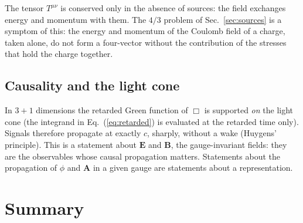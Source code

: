 \documentclass[11pt,a4paper]{book}
\begin{document}
The tensor $T^{\mu\nu}$ is conserved only in the absence of sources: the field exchanges energy and momentum
with them. The $4/3$ problem of Sec.~\ref{sec:sources} is a symptom of this: the energy and momentum of the
Coulomb field of a charge, taken alone, do not form a four-vector without the contribution of the
stresses that hold the charge together.

\subsection{Causality and the light cone}

In $3+1$ dimensions the retarded Green function of $\Box$ is supported \emph{on} the light cone (the
integrand in Eq.~(\ref{eq:retarded}) is evaluated at the retarded time only). Signals therefore propagate at exactly
$c$, sharply, without a wake (Huygens' principle). This is a statement about $\mathbf E$ and $\mathbf B$,
the gauge-invariant fields: they are the observables whose causal propagation matters. Statements
about the propagation of $\phi$ and $\mathbf A$ in a given gauge are statements about a representation.

\section{Summary}
\label{sec:ed-summary}
\end{document}
